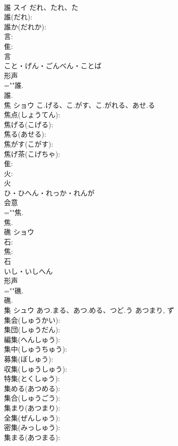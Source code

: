 \documentclass[8pt]{extreport}
\begin{document}
\begin{CJK}{UTF8}{min}
\\	誰	スイ	だれ、たれ、た		
\\	誰(だれ): 
\\	誰か(だれか): 
\\	言: 
\\	隹: 
\\	言	
\\	こと・げん・ごんべん・ことば	
\\	形声 
\\	=""誰.
\\	誰.
\\	焦	ショウ	こ.げる、こ.がす、こ.がれる、あせ.る		
\\	焦点(しょうてん): 
\\	焦げる(こげる): 
\\	焦る(あせる): 
\\	焦がす(こがす): 
\\	焦げ茶(こげちゃ): 
\\	隹: 
\\	火: 
\\	火	
\\	ひ・ひへん・れっか・れんが	
\\	会意 
\\	=""焦.
\\	焦.
\\	礁	ショウ			
\\	石: 
\\	焦: 
\\	石	
\\	いし・いしへん	
\\	形声 
\\	=""礁.
\\	礁.
\\	集	シュウ	あつ.まる、あつ.める、つど.う	あつまり, ず	
\\	集会(しゅうかい): 
\\	集団(しゅうだん): 
\\	編集(へんしゅう): 
\\	集中(しゅうちゅう): 
\\	募集(ぼしゅう): 
\\	収集(しゅうしゅう): 
\\	特集(とくしゅう): 
\\	集める(あつめる): 
\\	集合(しゅうごう): 
\\	集まり(あつまり): 
\\	全集(ぜんしゅう): 
\\	密集(みっしゅう): 
\\	集まる(あつまる): 

\end{CJK}
\end{document}
